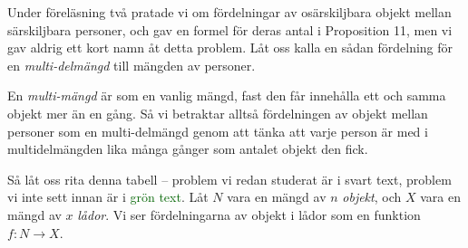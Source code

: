 \documentclass[nobib]{tufte-handout}
\begin{document}
Under föreläsning två pratade vi om fördelningar av osärskiljbara objekt mellan särskiljbara personer, och gav en formel för deras antal i Proposition 11, men vi gav aldrig ett kort namn åt detta problem. Låt oss kalla en sådan fördelning för en \emph{multi-delmängd} till mängden av personer.

En \emph{multi-mängd} är som en vanlig mängd, fast den får innehålla ett och samma objekt mer än en gång. Så vi betraktar alltså fördelningen av objekt mellan personer som en multi-delmängd genom att tänka att varje person är med i multidelmängden lika många gånger som antalet objekt den fick.

Så låt oss rita denna tabell -- problem vi redan studerat är i svart text, problem vi inte sett innan är i \textcolor{darkgreen}{grön text}. Låt $N$ vara en mängd av $n$ \emph{objekt}, och $X$ vara en mängd av $x$ \emph{lådor}. Vi ser fördelningarna av objekt i lådor som en funktion $f: N \to X$.
\end{document}
